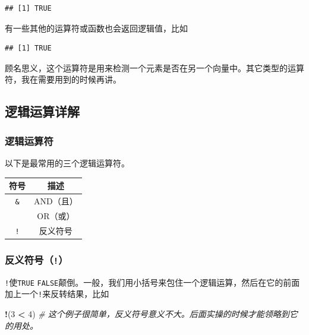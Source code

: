 \documentclass[]{book}
\newenvironment{Shaded}{\begin{snugshade}}{\end{snugshade}}
\newcommand{\CommentTok}[1]{\textcolor[rgb]{0.56,0.35,0.01}{\textit{#1}}}
\newcommand{\DecValTok}[1]{\textcolor[rgb]{0.00,0.00,0.81}{#1}}
\newcommand{\KeywordTok}[1]{\textcolor[rgb]{0.13,0.29,0.53}{\textbf{#1}}}
\newcommand{\NormalTok}[1]{#1}
\newcommand{\OperatorTok}[1]{\textcolor[rgb]{0.81,0.36,0.00}{\textbf{#1}}}
\newcommand{\StringTok}[1]{\textcolor[rgb]{0.31,0.60,0.02}{#1}}
\begin{document}
\begin{verbatim}
## [1] TRUE
\end{verbatim}

有一些其他的运算符或函数也会返回逻辑值，比如

\begin{Shaded}
\end{Shaded}

\begin{verbatim}
## [1] TRUE
\end{verbatim}

顾名思义，这个运算符是用来检测一个元素是否在另一个向量中。其它类型的运算符，我在需要用到的时候再讲。

\subsection{逻辑运算详解}

\subsubsection{逻辑运算符}

以下是最常用的三个逻辑运算符。

\begin{longtable}[]{@{}cc@{}}
\toprule
符号 & 描述\tabularnewline
\midrule
\endhead
\texttt{\&} & AND（且）\tabularnewline
\texttt{\textbar{}} & OR（或）\tabularnewline
\texttt{!} & 反义符号\tabularnewline
\bottomrule
\end{longtable}

\subsubsection{\texorpdfstring{反义符号（\texttt{!}）}{反义符号（!）}}

\texttt{!}使\texttt{TRUE} \texttt{FALSE}颠倒。一般，我们用小括号来包住一个逻辑运算，然后在它的前面加上一个\texttt{!}来反转结果，比如

\begin{Shaded}
\begin{Highlighting}[]
\OperatorTok{!}\NormalTok{(}\DecValTok{3} \OperatorTok{<}\StringTok{ }\DecValTok{4}\NormalTok{) }\CommentTok{# 这个例子很简单，反义符号意义不大。后面实操的时候才能领略到它的用处。}
\end{Highlighting}
\end{Shaded}
\end{document}
